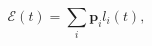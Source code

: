 \documentclass{article}
\renewcommand{\vec}[1]{\ensuremath{\mathbf{#1}}}
\begin{document}
\begin{equation}
  \mathcal{E}(t)=\sum\limits_i \vec{p}_il_i(t),
\nonumber\end{equation}
\end{document}
